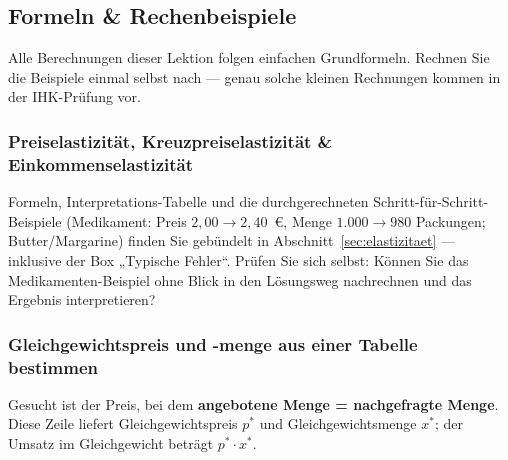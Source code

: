 \documentclass[11pt, a4paper]{article}
\begin{document}
\subsection{Formeln \& Rechenbeispiele}

Alle Berechnungen dieser Lektion folgen einfachen Grundformeln. Rechnen Sie die
Beispiele einmal selbst nach --- genau solche kleinen Rechnungen kommen in der
IHK-Prüfung vor.

\subsubsection{Preiselastizität, Kreuzpreiselastizität \& Einkommenselastizität}

Formeln, Interpretations-Tabelle und die durchgerechneten Schritt-für-Schritt-Beispiele
(Medikament: Preis $2{,}00 \rightarrow 2{,}40$~€, Menge $1.000 \rightarrow 980$
Packungen; Butter/Margarine) finden Sie gebündelt in
Abschnitt~\ref{sec:elastizitaet} --- inklusive der Box „Typische Fehler``.
Prüfen Sie sich selbst: Können Sie das Medikamenten-Beispiel ohne Blick in den
Lösungsweg nachrechnen und das Ergebnis interpretieren?

\subsubsection{Gleichgewichtspreis und -menge aus einer Tabelle bestimmen}

\begin{merksatz}[title={\bfseries Vorgehen}]
Gesucht ist der Preis, bei dem \textbf{angebotene Menge = nachgefragte Menge}. Diese
Zeile liefert Gleichgewichtspreis $p^*$ und Gleichgewichtsmenge $x^*$; der Umsatz im
Gleichgewicht beträgt $p^* \cdot x^*$.
\end{merksatz}
\end{document}
